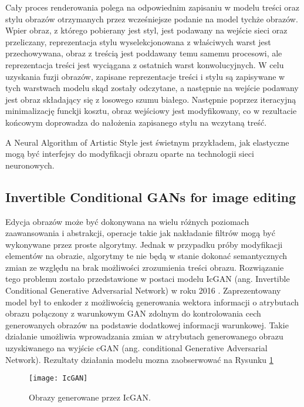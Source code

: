     Cały proces renderowania polega na odpowiednim zapisaniu w modelu treści
    oraz stylu obrazów otrzymanych przez wcześniejsze podanie na model tychże
    obrazów. Wpier obraz, z którego pobierany jest styl, jest podawany na
    wejście sieci oraz przeliczany, reprezentacja stylu wyselekcjonowana z
    właściwych warst jest przechowywana, obraz z treścią jest poddawany temu samemu
    procesowi, ale reprezentacja treści jest wyciągana z ostatnich
    warst konwolucyjnych.
    W celu uzyskania fuzji obrazów, zapisane reprezentacje treści i stylu są
    zapisywane w tych warstwach modelu skąd zostały odczytane, a następnie na wejście
    podawany jest obraz składający się z losowego szumu białego.
    Następnie poprzez iteracyjną minimalizację funckji kosztu, obraz wejściowy jest modyfikowany, co w rezultacie końcowym doprowadza do nałożenia zapisanego
    stylu na wczytaną treść.

    A Neural Algorithm of Artistic Style jest świetnym przykładem, jak elastyczne
    mogą być interfejsy do modyfikacji obrazu oparte na technologii sieci neuronowych.

  \subsection{Invertible Conditional GANs for image editing}
    Edycja obrazów może być dokonywana na wielu różnych poziomach zaawansowania
    i abstrakcji, operacje takie jak nakładanie filtrów mogą być
    wykonywane przez proste algorytmy. Jednak w przypadku próby modyfikacji
    elementów na obrazie, algorytmy te nie będą w stanie dokonać semantycznych
    zmian ze względu na brak możliwości zrozumienia treści obrazu. Rozwiązanie
    tego problemu zostało przedstawione w postaci modelu IcGAN
    (ang. Invertible Conditional Generative Adversarial Network) w roku 2016
    \cite{gan_editing}. Zaprezentowany model był to enkoder z możliwością
    generowania wektora informacji o atrybutach obrazu połączony z warunkowym
    GAN zdolnym do kontrolowania cech generowanych obrazów na podstawie dodatkowej
    informacji warunkowej. Takie działanie umożliwia wprowadzania zmian w
    atrybutach generowanego obrazu uzyskiwanego na wyjście cGAN (ang. conditional Generative
    Adversarial Network). Rezultaty działania modelu mozna zaobserwować na
    Rysunku \ref{fig:IcGAN}

    \begin{figure}[ht]
      \centering
      \texttt{[image: IcGAN]}
      \caption{Obrazy generowane przez IcGAN.}
      \label{fig:IcGAN}
    \end{figure}

